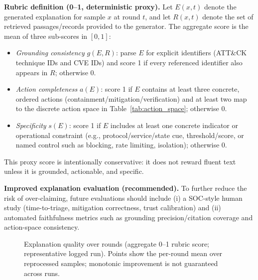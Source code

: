 \documentclass[conference]{IEEEtran}
\begin{document}
\textbf{Rubric definition (0--1, deterministic proxy).} Let $E(x,t)$ denote the generated explanation for sample $x$ at round $t$, and let $R(x,t)$ denote the set of retrieved passages/records provided to the generator. The aggregate score is the mean of three sub-scores in $[0,1]$:
\begin{itemize}
  \item \emph{Grounding consistency} $g(E,R)$: parse $E$ for explicit identifiers (ATT\&CK technique IDs and CVE IDs) and score 1 if every referenced identifier also appears in $R$; otherwise 0.
  \item \emph{Action completeness} $a(E)$: score 1 if $E$ contains at least three concrete, ordered actions (containment/mitigation/verification) and at least two map to the discrete action space in Table~\ref{tab:action_space}; otherwise 0.
  \item \emph{Specificity} $s(E)$: score 1 if $E$ includes at least one concrete indicator or operational constraint (e.g., protocol/service/state cue, threshold/score, or named control such as blocking, rate limiting, isolation); otherwise 0.
\end{itemize}
This proxy score is intentionally conservative: it does not reward fluent text unless it is grounded, actionable, and specific.

\textbf{Improved explanation evaluation (recommended).} To further reduce the risk of over-claiming, future evaluations should include (i) a SOC-style human study (time-to-triage, mitigation correctness, trust calibration) and (ii) automated faithfulness metrics such as grounding precision/citation coverage and action-space consistency.

\begin{figure}[t]
\centering
{}
\caption{Explanation quality over rounds (aggregate 0--1 rubric score; representative logged run). Points show the per-round mean over reprocessed samples; monotonic improvement is not guaranteed across runs.}
\label{fig:explanation_quality}
\end{figure}
\end{document}
